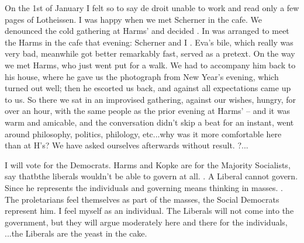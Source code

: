 
On the 1st of January I felt so to say de droit unable to work and read only a few pages of Lotheissen. I was happy when we met Scherner in the cafe. We denounced the cold gathering at Harms' and decided \?{to make ourselves comfortable at home}{es uns bei uns zu Haus] gemütlich zu machen}. In was arranged to meet the Harms in the cafe that evening: Scherner and I . Eva's bile, which really was very bad, meanwhile got better remarkably fast, served as a pretext. On the way we met Harms, who just went put for a walk. We had to accompany him back to his house, where he gave us the photograph from New Year's evening, which turned out well; then he escorted us back, and against all expectations came up to us. So there we sat in an improvised gathering, against our wishes, hungry, for over an hour, with the same people as the prior evening at Harms' -- and it was warm and amicable, and the conversation didn't skip a beat for an instant, went around philosophy, politics, philology, etc...why was it more comfortable here than at H's? We have asked ourselves afterwards without result. ?... \missing

I will vote for the Democrats. Harms and Kopke are for the Majority Socialists, say thatbthe liberals wouldn't be able to govern at all. . A Liberal cannot govern. Since he represents the individuals and governing means thinking in masses. . The proletarians feel themselves as part of the masses, the Social Democrats represent him. I feel myself as an individual. The Liberals will not come into the government, but they will argue moderately here and there for the individuals, ...the Liberals are the yeast in the cake.

